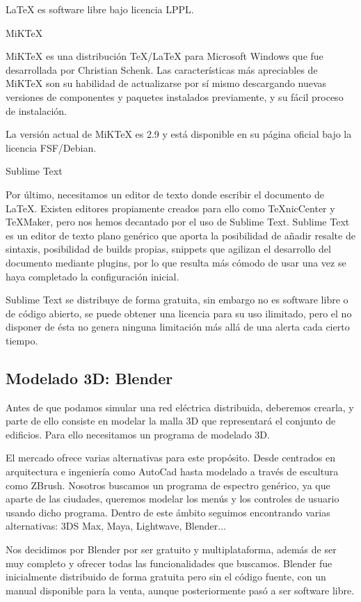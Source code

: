 \documentclass[12pt,a4paper,openright,oneside]{article}
\numberwithin{equation}{section}
\theoremstyle{definition}
\begin{document}
LaTeX es software libre bajo licencia LPPL.

MiKTeX

MiKTeX es una distribución TeX/LaTeX para Microsoft Windows que fue desarrollada por Christian Schenk. Las características más apreciables de MiKTeX son su habilidad de actualizarse por sí mismo descargando nuevas versiones de componentes y paquetes instalados previamente, y su fácil proceso de instalación.

La versión actual de MiKTeX es 2.9 y está disponible en su página oficial bajo la licencia FSF/Debian.

Sublime Text

Por último, necesitamos un editor de texto donde escribir el documento de LaTeX. Existen editores propiamente creados para ello como TeXnicCenter y TeXMaker, pero nos hemos decantado por el uso de Sublime Text. Sublime Text es un editor de texto plano genérico que aporta la posibilidad de añadir resalte de sintaxis, posibilidad de builds propias, snippets que agilizan el desarrollo del documento mediante plugins, por lo que resulta más cómodo de usar una vez se haya completado la configuración inicial.

Sublime Text se distribuye de forma gratuita, sin embargo no es software libre o de código abierto, se puede obtener una licencia para su uso ilimitado, pero el no disponer de ésta no genera ninguna limitación más allá de una alerta cada cierto tiempo.

\subsection{Modelado 3D: Blender}

Antes de que podamos simular una red eléctrica distribuida, deberemos crearla, y parte de ello consiste en modelar la malla 3D que representará el conjunto de edificios. Para ello necesitamos un programa de modelado 3D. 

El mercado ofrece varias alternativas para este propósito. Desde centrados en arquitectura e ingeniería como AutoCad hasta modelado a través de escultura como ZBrush. Nosotros buscamos un programa de espectro genérico, ya que aparte de las ciudades, queremos modelar los menús y los controles de usuario usando dicho programa. Dentro de este ámbito seguimos encontrando varias alternativas: 3DS Max, Maya, Lightwave, Blender... 

Nos decidimos por Blender por ser gratuito y multiplataforma, además de ser muy completo y ofrecer todas las funcionalidades que buscamos.
Blender fue inicialmente distribuido de forma gratuita pero sin el código fuente, con un manual disponible para la venta, aunque posteriormente pasó a ser software libre. 
\end{document}
